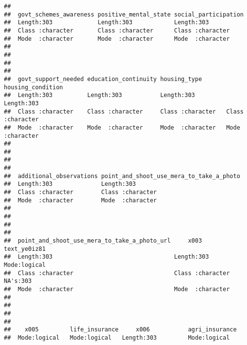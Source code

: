 \documentclass[
]{article}
\begin{document}
\begin{verbatim}
##                                                                              
##  govt_schemes_awareness positive_mental_state social_participation
##  Length:303             Length:303            Length:303          
##  Class :character       Class :character      Class :character    
##  Mode  :character       Mode  :character      Mode  :character    
##                                                                   
##                                                                   
##                                                                   
##                                                                   
##  govt_support_needed education_continuity housing_type       housing_condition 
##  Length:303          Length:303           Length:303         Length:303        
##  Class :character    Class :character     Class :character   Class :character  
##  Mode  :character    Mode  :character     Mode  :character   Mode  :character  
##                                                                                
##                                                                                
##                                                                                
##                                                                                
##  additional_observations point_and_shoot_use_mera_to_take_a_photo
##  Length:303              Length:303                              
##  Class :character        Class :character                        
##  Mode  :character        Mode  :character                        
##                                                                  
##                                                                  
##                                                                  
##                                                                  
##  point_and_shoot_use_mera_to_take_a_photo_url     x003           text_ye0iz81  
##  Length:303                                   Length:303         Mode:logical  
##  Class :character                             Class :character   NA's:303      
##  Mode  :character                             Mode  :character                 
##                                                                                
##                                                                                
##                                                                                
##                                                                                
##    x005         life_insurance     x006           agri_insurance
##  Mode:logical   Mode:logical   Length:303         Mode:logical  

\end{verbatim}
\end{document}
